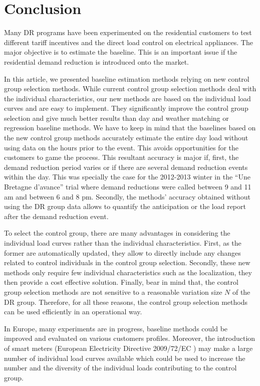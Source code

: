 \documentclass[journal]{IEEEtran}
\begin{document}
\section{Conclusion}\label{sec:conclu}

Many DR programs have been experimented on the residential customers
to test different tariff incentives and the direct load control on
electrical appliances. The major objective is to estimate the
baseline. This is an important issue if the residential demand
reduction is introduced onto the market.

In this article, we presented baseline estimation methods relying on
new control group selection methods. While current control group
selection methods deal with the individual characteristics, our new
methods are based on the individual load curves and are easy to
implement. They significantly improve the control group selection and
give much better results than day and weather matching or regression
baseline methods. We have to keep in mind that the baselines based on
the new control group methods accurately estimate the entire day load
without using data on the hours prior to the event. This avoids
opportunities for the customers to game the process. This resultant
accuracy is major if, first, the demand reduction period varies or if
there are several demand reduction events within the day. This was
specially the case for the 2012-2013 winter in the ``Une Bretagne
d'avance'' trial where demand reductions were called between 9 and 11
am and between 6 and 8 pm. Secondly, the methods' accuracy obtained
without using the DR group data allows to quantify the anticipation or
the load report after the demand reduction event.

To select the control group, there are many advantages in considering
the individual load curves rather than the individual
characteristics. First, as the former are automatically updated, they
allow to directly include any changes related to control individuals
in the control group selection. Secondly, these new methods only
require few individual characteristics such as the localization, they
then provide a cost effective solution. Finally, bear in mind that,
the control group selection methods are not sensitive to a reasonable
variation size $N$ of the DR group.  Therefore, for all these reasons,
the control group selection methods can be used efficiently in an
operational way.

In Europe, many experiments are in progress, baseline methods could be
improved and evaluated on various customers profiles. Moreover, the
introduction of smart meters (European Electricity Directive
2009/72/EC \cite{EC_2009}) may make a large number of individual load
curves available which could be used to increase the number and the
diversity of the individual loads contributing to the control group.
\end{document}

